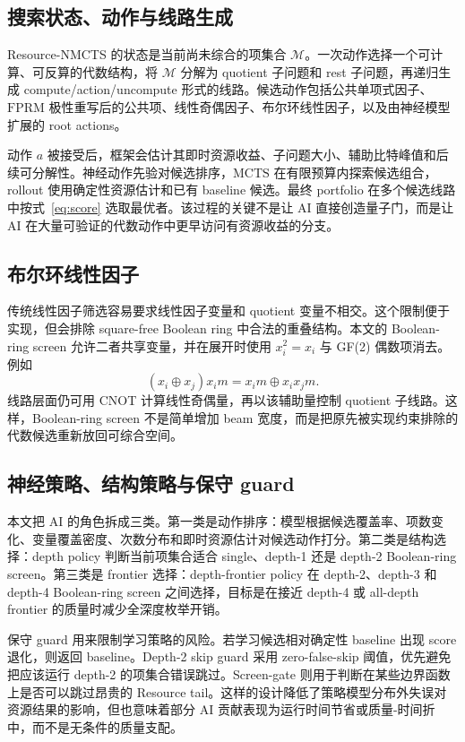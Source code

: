 \documentclass[UTF8,fontset=macnew,11pt]{ctexart}
\newcommand{\method}{Resource-NMCTS}
\newcommand{\screen}{Boolean-ring screen}
\newcommand{\fprm}{\ensuremath{\mathrm{FPRM}}}
\newcommand{\mcts}{\ensuremath{\mathrm{MCTS}}}
\newcommand{\xor}{\ensuremath{\oplus}}
\begin{document}
\subsection{搜索状态、动作与线路生成}

\method{} 的状态是当前尚未综合的项集合 $\mathcal{M}$。一次动作选择一个可计算、可反算的代数结构，将 $\mathcal{M}$ 分解为 quotient 子问题和 rest 子问题，再递归生成 compute/action/uncompute 形式的线路。候选动作包括公共单项式因子、\fprm{} 极性重写后的公共项、线性奇偶因子、布尔环线性因子，以及由神经模型扩展的 root actions。

动作 $a$ 被接受后，框架会估计其即时资源收益、子问题大小、辅助比特峰值和后续可分解性。神经动作先验对候选排序，\mcts{} 在有限预算内探索候选组合，rollout 使用确定性资源估计和已有 baseline 候选。最终 portfolio 在多个候选线路中按式~\eqref{eq:score} 选取最优者。该过程的关键不是让 AI 直接创造量子门，而是让 AI 在大量可验证的代数动作中更早访问有资源收益的分支。

\subsection{布尔环线性因子}

传统线性因子筛选容易要求线性因子变量和 quotient 变量不相交。这个限制便于实现，但会排除 square-free Boolean ring 中合法的重叠结构。本文的 \screen{} 允许二者共享变量，并在展开时使用 $x_i^2=x_i$ 与 GF(2) 偶数项消去。例如
\begin{equation}
  (x_i\xor x_j)x_i m = x_i m \xor x_i x_j m .
  \label{eq:boolean-ring}
\end{equation}
线路层面仍可用 CNOT 计算线性奇偶量，再以该辅助量控制 quotient 子线路。这样，\screen{} 不是简单增加 beam 宽度，而是把原先被实现约束排除的代数候选重新放回可综合空间。

\subsection{神经策略、结构策略与保守 guard}

本文把 AI 的角色拆成三类。第一类是动作排序：模型根据候选覆盖率、项数变化、变量覆盖密度、次数分布和即时资源估计对候选动作打分。第二类是结构选择：depth policy 判断当前项集合适合 single、depth-1 还是 depth-2 \screen{}。第三类是 frontier 选择：depth-frontier policy 在 depth-2、depth-3 和 depth-4 \screen{} 之间选择，目标是在接近 depth-4 或 all-depth frontier 的质量时减少全深度枚举开销。

保守 guard 用来限制学习策略的风险。若学习候选相对确定性 baseline 出现 score 退化，则返回 baseline。Depth-2 skip guard 采用 zero-false-skip 阈值，优先避免把应该运行 depth-2 的项集合错误跳过。Screen-gate 则用于判断在某些边界函数上是否可以跳过昂贵的 Resource tail。这样的设计降低了策略模型分布外失误对资源结果的影响，但也意味着部分 AI 贡献表现为运行时间节省或质量-时间折中，而不是无条件的质量支配。
\end{document}
